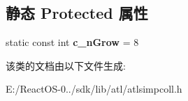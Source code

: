 \subsection*{静态 Protected 属性}
\begin{DoxyCompactItemize}
\item 
\mbox{\label{class_a_t_l_1_1_c_simple_array_af5980750691abd8be24ff937ebef85a1}} 
static const int {\bfseries c\+\_\+n\+Grow} = 8
\end{DoxyCompactItemize}


该类的文档由以下文件生成\+:\begin{DoxyCompactItemize}
\item 
E\+:/\+React\+O\+S-\/0../sdk/lib/atl/atlsimpcoll.\+h\end{DoxyCompactItemize}
